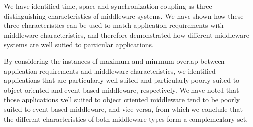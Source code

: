 \documentclass{acm_proc_article-sp}
\begin{document}
We have identified time, space and synchronization coupling as three distinguishing characteristics of middleware systems. We have shown how these three characteristics can be used to match application requirements with middleware characteristics, and therefore demonstrated how different middleware systems are well suited to particular applications. 

By considering the instances of maximum and minimum overlap between application requirements and middleware characteristics, we identified applications that are particularly well suited and particularly poorly suited to object oriented and event based middleware, respectively. We have noted that those applications well suited to object oriented middleware tend to be poorly suited to event based middleware, and vice versa, from which we conclude that the different characteristics of both middleware types form a complementary set.





\balancecolumns
\end{document}
